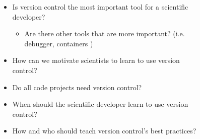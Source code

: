 \documentclass[usenames,dvipsnames]{beamer}
\theoremstyle{plain}
\theoremstyle{definition}
\begin{document}
\begin{frame}{\setframetitle{}}
\begin{columns}%
 
  \begin{itemize}
    \setlength\itemsep{1em}
    \item Is version control the most important tool for a scientific developer?  
    \begin{itemize}
      \setlength\itemsep{0.5em}
      \item Are there other tools that are more important? (i.e. debugger, containers )
    \end{itemize}
    \item How can we motivate scientists to learn to use version control? 
    \item Do all code projects need version control? 
    \item When should the scientific developer learn to use version control? 
    \item How and who should teach version control's best practices?
  \end{itemize}
  
    \begin{figure}
      \captionsetup[subfigure]{justification=centering}
      \centering
      {}   
    \end{figure}
\end{columns}
\end{frame}
\end{document}
